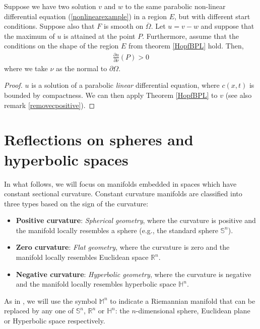 \begin{proposition}
	\label{secondapplication}
	Suppose we have two solution $v$ and $w$ to the same parabolic non-linear differential equation (\ref{nonlinearexample}) in a region $E$, but with different start conditions. Suppose also that $F$ is smooth on  $\overline{\Omega}$. Let $u=v-w$ and suppose that the maximum of $u$ is attained at the point $P$. Furthermore, assume that the conditions on the shape of the region $E$ from theorem \ref{HopfBPL} hold. Then, 
	\begin{align*}
		\frac{\partial u}{\partial \nu}(P) >0
	\end{align*}
	where we take $\nu$ as the normal to $\partial\Omega$.
\end{proposition}

\begin{proof}
	$u$ is a solution of a parabolic \textit{linear} differential equation, where  $c(x, t)$ is bounded by compactness. We can then apply Theorem \ref{HopfBPL} to $v$ (see also remark \ref{removecpositive}).
\end{proof}

\section{Reflections on spheres and hyperbolic spaces}	
\label{reflections definitions}

In what follows, we will focus on manifolds embedded in spaces which have constant sectional curvature. Constant curvature manifolds are classified into three types based on the sign of the curvature:
\begin{itemize}
	\item \textbf{Positive curvature}: \textit{Spherical geometry}, where the curvature is positive and the manifold locally resembles a sphere (e.g., the standard sphere $\mathbb{S}^n$).
	\item \textbf{Zero curvature}: \textit{Flat geometry}, where the curvature is zero and the manifold locally resembles Euclidean space $\mathbb{R}^n$.
	\item \textbf{Negative curvature}: \textit{Hyperbolic geometry}, where the curvature is negative and the manifold locally resembles hyperbolic space $\mathbb{H}^n$.
\end{itemize}

As in \cite{italiani}, we will use the symbol $\mathbb{M}^n$ to indicate a Riemannian manifold that can be replaced by any one of  $\mathbb{S}^n$, $\mathbb{R}^n$ or $\mathbb{H}^n$: the $n$-dimensional sphere, Euclidean plane or Hyperbolic space respectively. 

